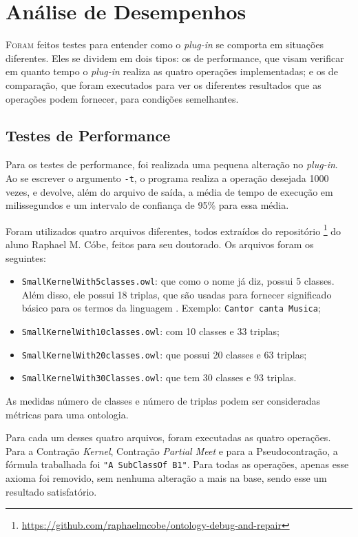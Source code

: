 \chapter{Análise de Desempenhos}
\label{chap:testes}

\lettrine{F}{oram} feitos testes para entender como o \textit{plug-in} se comporta em situações diferentes. Eles se dividem em dois tipos: os de performance, que visam verificar em quanto tempo o \textit{plug-in} realiza as quatro operações implementadas; e os de comparação, que foram executados para ver os diferentes resultados que as operações podem fornecer, para condições semelhantes. 

\section{Testes de Performance}

Para os testes de performance, foi realizada uma pequena alteração no \textit{plug-in}. Ao se escrever o argumento \texttt{-t}, o programa realiza a operação desejada 1000 vezes, e devolve, além do arquivo de saída, a média de tempo de execução em milissegundos e um intervalo de confiança de 95\% para essa média.

Foram utilizados quatro arquivos diferentes, todos extraídos do repositório \footnote{\url{https://github.com/raphaelmcobe/ontology-debug-and-repair}} do aluno Raphael M. Cóbe, feitos para seu doutorado. Os arquivos foram os seguintes:

\begin{itemize}
	\item \texttt{SmallKernelWith5classes.owl}: que como o nome já diz, possui 5 classes. Além disso, ele possui 18 triplas, que são usadas para fornecer significado básico para os termos da linguagem \cite{ferramentasOWLReco2}. Exemplo: \texttt{Cantor canta Musica};
	\item \texttt{SmallKernelWith10classes.owl}: com 10 classes e 33 triplas;
	\item \texttt{SmallKernelWith20classes.owl}: que possui 20 classes e 63 triplas;
	\item \texttt{SmallKernelWith30Classes.owl}: que tem 30 classes e 93 triplas.
\end{itemize}

As medidas número de classes e número de triplas podem ser consideradas métricas para uma ontologia.

Para cada um desses quatro arquivos, foram executadas as quatro operações. Para a Contração \textit{Kernel}, Contração \textit{Partial Meet} e para a Pseudocontração, a fórmula trabalhada foi \texttt{"A SubClassOf B1"}. Para todas as operações, apenas esse axioma foi removido, sem nenhuma alteração a mais na base, sendo esse um resultado satisfatório.


